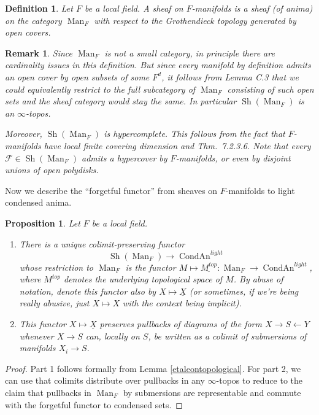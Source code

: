 \documentclass[12pt]{article}
\newtheorem{proposition}[theorem]{Proposition}
\newtheorem{definition}[theorem]{Definition}
\newtheorem{remark}[theorem]{Remark}
\newcommand{\on}{\operatorname}
\begin{document}
\begin{definition}
Let $F$ be a local field.  A \emph{sheaf on $F$-manifolds} is a sheaf (of anima) on the category $\on{Man}_F$ with respect to the Grothendieck topology generated by open covers.
\end{definition}

\begin{remark}
Since $\on{Man}_F$ is not a small category, in principle there are cardinality issues in this definition.  But since every manifold by definition admits an open cover by open subsets of some $F^d$, it follows from \cite{HoyoisLefschetz} Lemma C.3 that we could equivalently restrict to the full subcategory of $\on{Man}_F$ consisting of such open sets and the sheaf category would stay the same.  In particular $\on{Sh}(\on{Man}_F)$ is an $\infty$-topos.

Moreover, $\on{Sh}(\on{Man}_F)$ is hypercomplete.  This follows from the fact that $F$-manifolds have local finite covering dimension and \cite{LurieHTT} Thm.\ 7.2.3.6.  Note that every $\mathcal{F}\in\on{Sh}(\on{Man}_F)$ admits a hypercover by $F$-manifolds, or even by disjoint unions of open polydisks.
\end{remark}

Now we describe the ``forgetful functor'' from sheaves on $F$-manifolds to light condensed anima.

\begin{proposition}\label{underlying}
Let $F$ be a local field.
\begin{enumerate}
\item There is a unique colimit-preserving functor
$$\on{Sh}(\on{Man}_F)\rightarrow \on{CondAn}^{light}$$
whose restriction to $\on{Man}_F$ is the functor $M\mapsto \underline{M^{top}}: \on{Man}_F\rightarrow \on{CondAn}^{light}$, where $M^{top}$ denotes the underlying topological space of $M$.  By abuse of notation, denote this functor also by $X\mapsto \underline{X}$ (or sometimes, if we're being really abusive, just $X\mapsto X$ with the context being implicit).
\item This functor $X\mapsto \underline{X}$ preserves pullbacks of diagrams of the form $X\rightarrow S\leftarrow Y$ whenever $X\to S$ can, locally on $S$, be written as a colimit of submersions of manifolds $X_i \to S$.
\end{enumerate}
\end{proposition}
\begin{proof}
Part 1 follows formally from Lemma \ref{etaleontopological}.  For part 2, we can use that colimits distribute over pullbacks in any $\infty$-topos to reduce to the claim that pullbacks in $\on{Man}_F$ by submersions are representable and commute with the forgetful functor to condensed sets.
\end{proof}
\end{document}
